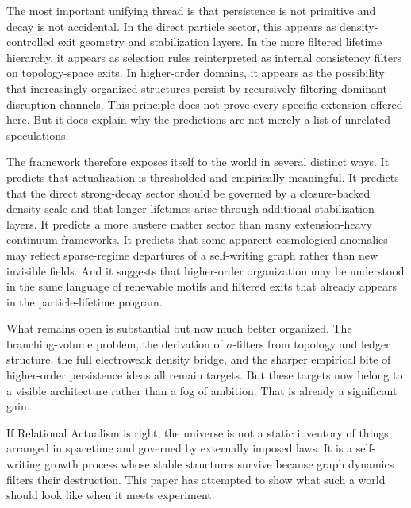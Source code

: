 \documentclass[11pt]{article}
\begin{document}
The most important unifying thread is that persistence is not primitive and decay is not accidental. In the direct particle sector, this appears as density-controlled exit geometry and stabilization layers. In the more filtered lifetime hierarchy, it appears as selection rules reinterpreted as internal consistency filters on topology-space exits. In higher-order domains, it appears as the possibility that increasingly organized structures persist by recursively filtering dominant disruption channels. This principle does not prove every specific extension offered here. But it does explain why the predictions are not merely a list of unrelated speculations.

The framework therefore exposes itself to the world in several distinct ways. It predicts that actualization is thresholded and empirically meaningful. It predicts that the direct strong-decay sector should be governed by a closure-backed density scale and that longer lifetimes arise through additional stabilization layers. It predicts a more austere matter sector than many extension-heavy continuum frameworks. It predicts that some apparent cosmological anomalies may reflect sparse-regime departures of a self-writing graph rather than new invisible fields. And it suggests that higher-order organization may be understood in the same language of renewable motifs and filtered exits that already appears in the particle-lifetime program.

What remains open is substantial but now much better organized. The branching-volume problem, the derivation of $\sigma$-filters from topology and ledger structure, the full electroweak density bridge, and the sharper empirical bite of higher-order persistence ideas all remain targets. But these targets now belong to a visible architecture rather than a fog of ambition. That is already a significant gain.

If Relational Actualism is right, the universe is not a static inventory of things arranged in spacetime and governed by externally imposed laws. It is a self-writing growth process whose stable structures survive because graph dynamics filters their destruction. This paper has attempted to show what such a world should look like when it meets experiment.
\end{document}
